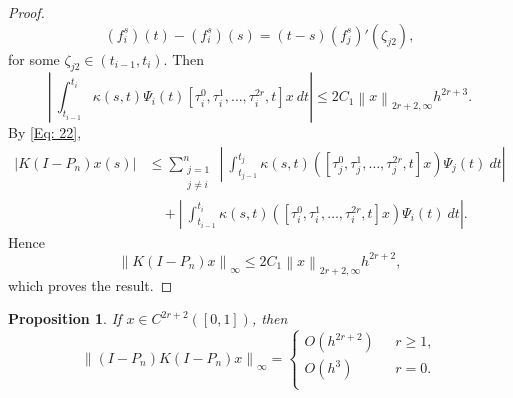\documentclass[sn-mathphys-num]{sn-jnl}%
\theoremstyle{thmstyleone}%
\newtheorem{proposition}[theorem]{Proposition}%
\theoremstyle{thmstyletwo}%
\theoremstyle{thmstylethree}%
\newcommand{\norm}[1]{\left\lVert #1\right\rVert}
\begin{document}
\begin{proof}
	\begin{equation*}
		(f_i^s)(t)-(f_i^s)(s) = (t-s)(f_j^s)'(\zeta_{j2}),
	\end{equation*}
	for some $\zeta_{j2} \in (t_{i-1}, t_i)$. Then
	\begin{equation*}
		\left|~\int_{t_{i-1}}^{t_i}  \kappa(s,t) \Psi_i(t) \left[\tau_i^0,\tau_i^1,\ldots, \tau_i^{2r},t\right]x ~dt \right| \le  2 C_1 \norm{x}_{2r +2, \infty} h^{2r + 3}.
	\end{equation*}
	By \eqref{Eq: 22},
	\begin{align*}
		\left|K(I-P_n)x(s)\right| &\le \sum_{\substack{j=1 \\  j\ne i} }^{n} ~	\left|~\int_{t_{j-1}}^{t_j}  \kappa(s,t) \left( [\tau_j^0,\tau_j^1,\ldots, \tau_j^{2r},t]x \right) \Psi_j(t) ~dt \right|\\
		& \quad + \left|~\int_{t_{i-1}}^{t_i}  \kappa(s,t) \left( [\tau_i^0,\tau_i^1,\ldots, \tau_i^{2r},t]x \right) \Psi_i(t) ~dt 	\right| .
	\end{align*}
	Hence
	\begin{equation*}
		\norm{K(I-P_n)x}_\infty \le 2 C_1 \norm{x}_{2r +2, \infty} h^{2r + 2},
	\end{equation*}
	which proves the result.
\end{proof}
\begin{proposition} \label{p2}
	If $x \in C^{2r+2}([0,1])$, then
	\begin{equation*} 	
		\norm{(I-P_n)K(I-P_n)x}_\infty =  
		\begin{cases}
			O(h^{2r+2})~~~          &  r \ge 1,\\
			O(h^3)~~~          & r=0.\\
		\end{cases} 
	\end{equation*}
\end{proposition}	
\end{document}
